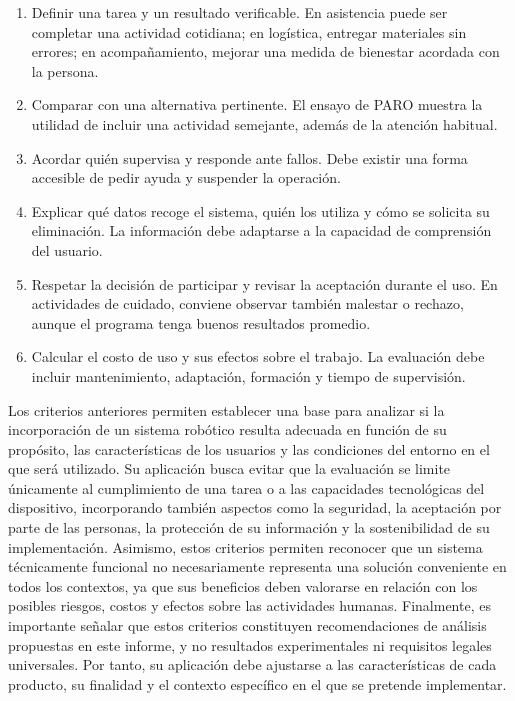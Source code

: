 \documentclass[11pt,a4paper]{article}
\begin{document}
\begin{enumerate}
  \item Definir una tarea y un resultado verificable. En asistencia puede ser completar una actividad cotidiana; en logística, entregar materiales sin errores; en acompañamiento, mejorar una medida de bienestar acordada con la persona.
  \item Comparar con una alternativa pertinente. El ensayo de PARO muestra la utilidad de incluir una actividad semejante, además de la atención habitual.
  \item Acordar quién supervisa y responde ante fallos. Debe existir una forma accesible de pedir ayuda y suspender la operación.
  \item Explicar qué datos recoge el sistema, quién los utiliza y cómo se solicita su eliminación. La información debe adaptarse a la capacidad de comprensión del usuario.
  \item Respetar la decisión de participar y revisar la aceptación durante el uso. En actividades de cuidado, conviene observar también malestar o rechazo, aunque el programa tenga buenos resultados promedio.
  \item Calcular el costo de uso y sus efectos sobre el trabajo. La evaluación debe incluir mantenimiento, adaptación, formación y tiempo de supervisión.
\end{enumerate}

Los criterios anteriores permiten establecer una base para analizar si la incorporación de un sistema robótico resulta adecuada en función de su propósito, las características de los usuarios y las condiciones del entorno en el que será utilizado. Su aplicación busca evitar que la evaluación se limite únicamente al cumplimiento de una tarea o a las capacidades tecnológicas del dispositivo, incorporando también aspectos como la seguridad, la aceptación por parte de las personas, la protección de su información y la sostenibilidad de su implementación. Asimismo, estos criterios permiten reconocer que un sistema técnicamente funcional no necesariamente representa una solución conveniente en todos los contextos, ya que sus beneficios deben valorarse en relación con los posibles riesgos, costos y efectos sobre las actividades humanas. Finalmente, es importante señalar que estos criterios constituyen recomendaciones de análisis propuestas en este informe, y no resultados experimentales ni requisitos legales universales. Por tanto, su aplicación debe ajustarse a las características de cada producto, su finalidad y el contexto específico en el que se pretende implementar.
\end{document}
